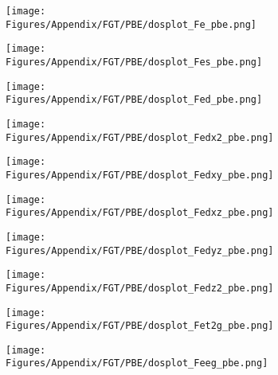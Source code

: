 \newpage    
\begin{figure}[H]
\centering
\begin{subfigure}{0.24\textwidth}
    \centering
    \texttt{[image: Figures/Appendix/FGT/PBE/dosplot\_Fe\_pbe.png]}
    \label{dosplot_Fe_pbe}
\end{subfigure}
\hfill
\begin{subfigure}{0.24\textwidth}
\centering
    \texttt{[image: Figures/Appendix/FGT/PBE/dosplot\_Fes\_pbe.png]}
    \label{dosplot_Fes_pbe}
\end{subfigure}
\hfill
\begin{subfigure}{0.24\textwidth}
    \texttt{[image: Figures/Appendix/FGT/PBE/dosplot\_Fed\_pbe.png]}
    \label{dosplot_Fed_pbe}
\end{subfigure}
\hfill
\begin{subfigure}{0.24\textwidth}
    \texttt{[image: Figures/Appendix/FGT/PBE/dosplot\_Fedx2\_pbe.png]}
    \label{dodosplot_Fedx2_pbe}
\end{subfigure}
\hfill
\begin{subfigure}{0.24\textwidth}
    \texttt{[image: Figures/Appendix/FGT/PBE/dosplot\_Fedxy\_pbe.png]}
    \label{dosplot_Fedxy_pbe}
\end{subfigure}
\hfill
\begin{subfigure}{0.24\textwidth}
    \texttt{[image: Figures/Appendix/FGT/PBE/dosplot\_Fedxz\_pbe.png]}
    \label{dosplot_Fedxz_pbe}
\end{subfigure}
\hfill
\begin{subfigure}{0.24\textwidth}
    \texttt{[image: Figures/Appendix/FGT/PBE/dosplot\_Fedyz\_pbe.png]}
    \label{dosplot_Fedyz_pbe}
\end{subfigure}
\hfill
\begin{subfigure}{0.24\textwidth}
    \texttt{[image: Figures/Appendix/FGT/PBE/dosplot\_Fedz2\_pbe.png]}
    \label{dosplot_Fedz2_pbe}
\end{subfigure}
\hfill
\begin{subfigure}{0.24\textwidth}
    \texttt{[image: Figures/Appendix/FGT/PBE/dosplot\_Fet2g\_pbe.png]}
    \label{dosplot_Fet2g_pbe}
\end{subfigure}
\hfill
\begin{subfigure}{0.24\textwidth}
    \texttt{[image: Figures/Appendix/FGT/PBE/dosplot\_Feeg\_pbe.png]}
    \label{dosplot_Fneg_pbe}
\end{subfigure}

\end{figure}
